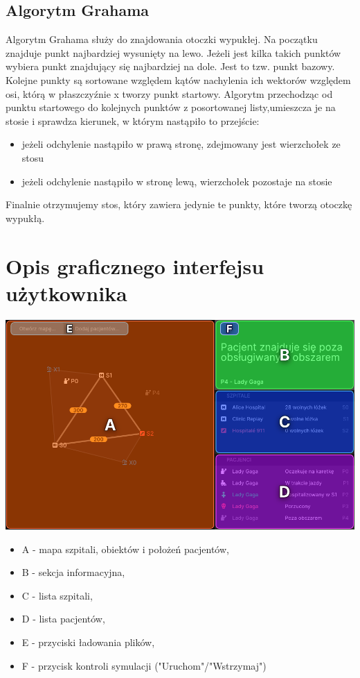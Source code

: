 \documentclass{article}
\begin{document}
\subsection{Algorytm Grahama}
\label{algo_graham}

Algorytm Grahama służy do znajdowania otoczki wypukłej. Na początku znajduje punkt najbardziej wysunięty na lewo. Jeżeli jest kilka takich punktów wybiera punkt znajdujący się najbardziej na dole. Jest to tzw. punkt bazowy. Kolejne punkty są sortowane względem kątów nachylenia ich wektorów względem osi, którą w płaszczyźnie x tworzy punkt startowy.
Algorytm przechodząc od punktu startowego do kolejnych punktów z posortowanej listy,umieszcza je na stosie i sprawdza kierunek, w którym nastąpiło to przejście:
\begin{itemize}
 \item jeżeli odchylenie nastąpiło w prawą stronę, zdejmowany jest wierzchołek ze stosu
 \item jeżeli odchylenie nastąpiło w stronę lewą, wierzchołek pozostaje na stosie
\end{itemize}
Finalnie otrzymujemy stos, który zawiera jedynie te punkty, które tworzą otoczkę wypukłą.

\pagebreak
\section{Opis graficznego interfejsu użytkownika}

\centerline{\includegraphics[scale=0.3]{images/areas.png}}

 \vspace{0.7cm}
 
\begin{itemize}
    \item A - mapa szpitali, obiektów i położeń pacjentów,
    \item B - sekcja informacyjna,
    \item C - lista szpitali,
    \item D - lista pacjentów,
    \item E - przyciski ładowania plików,
    \item F - przycisk kontroli symulacji ("Uruchom"/"Wstrzymaj")
\end{itemize}
\end{document}
